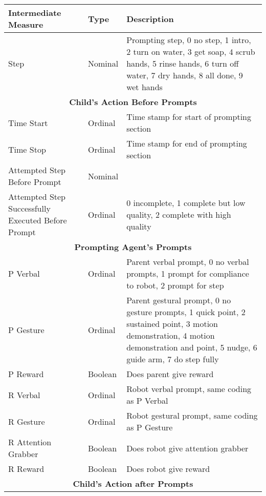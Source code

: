 \begin{table}[h]
	\centering
	\begin{tabular}{ | p{5cm} | l | p{7cm} | }
		\hline
		\textbf{Intermediate Measure}	&	\textbf{Type}	&	\textbf{Description}	\\	\hline	\hline
		
		Step	&	Nominal	&	Prompting step, 0 no step, 1 intro, 2 turn on water, 3 get soap, 4 scrub hands, 5 rinse hands, 6 turn off water, 7 dry hands, 8 all done, 9 wet hands	\\	\hline \hline
	
		\multicolumn{3}{|c|}{\textbf{Child's Action Before Prompts}} \\	\hline
	
		Time Start	&	Ordinal	&	Time stamp for start of prompting section	\\	\hline
		Time Stop	&	Ordinal	&	Time stamp for end of prompting section	\\	\hline
		Attempted Step Before Prompt	&	Nominal	&		\\	\hline
		Attempted Step Successfully Executed Before Prompt	&	Ordinal	&	0 incomplete, 1 complete but low quality, 2 complete with high quality	\\	\hline	\hline
		
		\multicolumn{3}{|c|}{\textbf{Prompting Agent's Prompts}} \\	\hline
		
		P Verbal	&	Ordinal	&	Parent verbal prompt, 0 no verbal prompts, 1 prompt for compliance to robot, 2 prompt for step	\\	\hline
		P Gesture	&	Ordinal	&	Parent gestural prompt, 0 no gesture prompts, 1 quick point, 2 sustained point, 3 motion demonstration, 4 motion demonstration and point, 5 nudge, 6 guide arm, 7 do step fully	\\	\hline
		P Reward	&	Boolean	&	Does parent give reward	\\	\hline
		R Verbal	&	Ordinal	&	Robot verbal prompt, same coding as P Verbal	\\	\hline
		R Gesture	&	Ordinal	&	Robot gestural prompt, same coding as P Gesture	\\	\hline
		R Attention Grabber	&	Boolean	&	Does robot give attention grabber	\\	\hline
		R Reward	&	Boolean	&	Does robot give reward	\\	\hline	\hline
		
		\multicolumn{3}{|c|}{\textbf{Child's Action after Prompts}} \\	\hline
		

\end{tabular}
\end{table}
